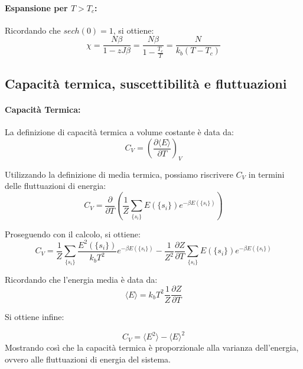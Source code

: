 \paragraph{Espansione per $T>T_c$:}
Ricordando che $sech (0) =1$, si ottiene:
\begin{equation}
    \chi = \frac{N \beta}{1 - z J \beta} = \frac{N \beta}{1-\frac{T_c}{T}} = \frac{N}{k_b(T-T_c)}
\end{equation}

\subsection{Capacità termica, suscettibilità e fluttuazioni}\label{appendice:calcolo_cv_chi}

\paragraph{Capacità Termica:}

La definizione di capacità termica a volume costante è data da:
\begin{equation}
C_V = \left( \frac{\partial \langle E \rangle}{\partial T} \right)_V
\end{equation}

Utilizzando la definizione di media termica, possiamo riscrivere $C_V$ in termini delle fluttuazioni di energia:
\begin{equation}
    C_V = \frac{\partial}{\partial T} \left( \frac{1}{Z} \sum_{\{s_i\}} E(\{s_i\}) e^{-\beta E(\{s_i\})} \right)
\end{equation}

Proseguendo con il calcolo, si ottiene:
\begin{equation}
    C_V = \frac{1}{Z} \sum_{\{s_i\}} \frac{E^2(\{s_i\})}{k_b T^2} e^{-\beta E(\{s_i\})} - \frac{1}{Z^2} \frac{\partial Z}{\partial T}\sum_{\{s_i\}} E(\{s_i\}) e^{-\beta E(\{s_i\})}
\end{equation}

Ricordando che l'energia media è data da:
\begin{equation}
    \langle E \rangle = k_b T^2 \frac{1}{Z} \frac{\partial Z}{\partial T}
\end{equation}

Si ottiene infine:

\begin{equation}
    C_V = \langle E^2 \rangle - \langle E \rangle^2
\end{equation}
Mostrando così che la capacità termica è proporzionale alla varianza dell'energia, ovvero alle fluttuazioni di energia del sistema.

